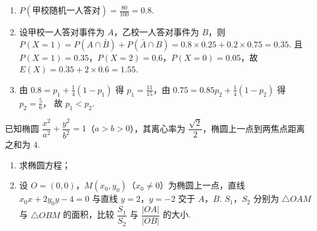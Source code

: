 \begin{solution}
\begin{enumerate}
\item \(P(\text{甲校随机一人答对})=\frac{80}{100}=0.8\).

\item 设甲校一人答对事件为 \(A\)，乙校一人答对事件为 \(B\)，则
\(P(X=1)=P(A\cap\bar B)+P(\bar A\cap B)=0.8\times0.25+0.2\times0.75=0.35\).
且 \(P(X=1)=0.35\)，\(P(X=2)=0.6\)，\(P(X=0)=0.05\)，故 \(E(X)=0.35+2\times0.6=1.55\).

\item 由 \(0.8=p_1+\frac14(1-p_1)\) 得 \(p_1=\frac{11}{15}\)，由 \(0.75=0.85p_2+\frac14(1-p_2)\) 得 \(p_2=\frac56\)，
故 \(p_1<p_2\).
\end{enumerate}
\end{solution}

\begin{problem}
已知椭圆 \(\dfrac{x^2}{a^2}+\dfrac{y^2}{b^2}=1\)（\(a>b>0\)），其离心率为 \(\dfrac{\sqrt{2}}{2}\)，椭圆上一点到两焦点距离之和为 \(4\).

\begin{enumerate}
\item 求椭圆方程；
\item 设 \(O=(0,0)\)，\(M(x_0,y_0)\)（\(x_0\ne0\)）为椭圆上一点，直线 \(x_0x+2y_0y-4=0\) 与直线 \(y=2\)，\(y=-2\) 交于 \(A\)，\(B\). \(S_1\)，\(S_2\) 分别为 \(\triangle OAM\) 与 \(\triangle OBM\) 的面积，比较 \(\dfrac{S_1}{S_2}\) 与 \(\dfrac{|OA|}{|OB|}\) 的大小.
\end{enumerate}
\end{problem}

